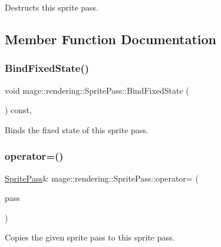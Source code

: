 Destructs this sprite pass. 

\subsection{Member Function Documentation}
\mbox{\label{classmage_1_1rendering_1_1_sprite_pass_a76d7ea36f7e24283411dc90686238136}} 
\subsubsection{\texorpdfstring{Bind\+Fixed\+State()}{BindFixedState()}}
{\footnotesize\ttfamily void mage\+::rendering\+::\+Sprite\+Pass\+::\+Bind\+Fixed\+State (\begin{DoxyParamCaption}{ }\end{DoxyParamCaption}) const\hspace{0.3cm}{\ttfamily [private]}, {\ttfamily [noexcept]}}

Binds the fixed state of this sprite pass. \mbox{\label{classmage_1_1rendering_1_1_sprite_pass_a33cd3abf007bafb47d76524096e24eca}} 
\subsubsection{\texorpdfstring{operator=()}{operator=()}\hspace{0.1cm}{\footnotesize\ttfamily [1/2]}}
{\footnotesize\ttfamily \mbox{\hyperlink{classmage_1_1rendering_1_1_sprite_pass}{Sprite\+Pass}}\& mage\+::rendering\+::\+Sprite\+Pass\+::operator= (\begin{DoxyParamCaption}\item[{const \mbox{\hyperlink{classmage_1_1rendering_1_1_sprite_pass}{Sprite\+Pass}} \&}]{pass }\end{DoxyParamCaption})\hspace{0.3cm}{\ttfamily [delete]}}

Copies the given sprite pass to this sprite pass.


